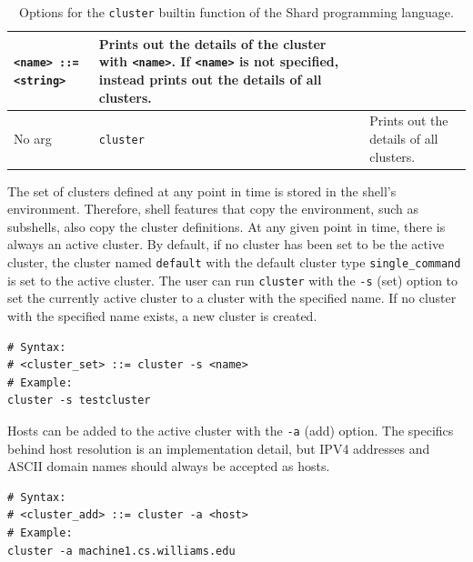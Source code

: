 \documentclass[twoside]{report}
\begin{document}
\begin{table}
\begin{center}
\begin{tabularx}{\textwidth}{|l|X|X|}
      \texttt{<name> ::= <string>}  & Prints out the details of the cluster with \texttt{<name>}. If \texttt{<name>} is not specified, instead prints out the details of all clusters.
      \\ \hline
      No arg                        & \texttt{cluster}                                                                                                                                                                             & Prints out the details of all clusters.
      \\ \hline
    \end{tabularx}
    \caption{Options for the \texttt{cluster} builtin function of the Shard programming language.}
    \label{fig:pl_cluster_options}
  \end{center}
\end{table}

The set of clusters defined at any point in time is stored in the shell's environment.
Therefore, shell features that copy the environment, such as subshells, also copy the cluster definitions.
At any given point in time, there is always an active cluster.
By default, if no cluster has been set to be the active cluster, the cluster named \texttt{default} with the default cluster type \texttt{single\_command} is set to the active cluster.
The user can run \texttt{cluster} with the \texttt{-s} (set) option to set the currently active cluster to a cluster with the specified name.
If no cluster with the specified name exists, a new cluster is created.

\begin{minipage}[c]{\textwidth-15pt}
  \begin{lstlisting}[language=Shard]
# Syntax:
# <cluster_set> ::= cluster -s <name>
# Example:
cluster -s testcluster
\end{lstlisting}
  \smallskip
\end{minipage}

Hosts can be added to the active cluster with the \texttt{-a} (add) option.
The specifics behind host resolution is an implementation detail, but IPV4 addresses and ASCII domain names should always be accepted as hosts.

\begin{minipage}[c]{\textwidth-15pt}
  \begin{lstlisting}[language=Shard]
# Syntax:
# <cluster_add> ::= cluster -a <host>
# Example:
cluster -a machine1.cs.williams.edu
\end{lstlisting}
  \smallskip
\end{minipage}
\end{document}
